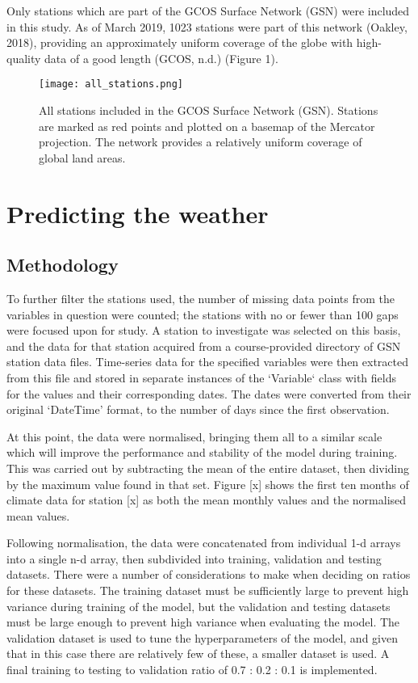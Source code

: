 \documentclass[12pt]{article}
\begin{document}
Only stations which are part of the GCOS Surface Network (GSN) were included in this study. As of March 2019, 1023 stations were part 
of this network (Oakley, 2018), providing an approximately uniform coverage of the globe with high-quality data of a good length 
(GCOS, n.d.) (Figure 1).

    \begin{figure}
        \centering
        \texttt{[image: all\_stations.png]}
        \caption{All stations included in the GCOS Surface Network (GSN). Stations are marked as red points and plotted on a basemap 
        of the Mercator projection. The network provides a relatively uniform coverage of global land areas.}
        \label{fig:my_label}
    \end{figure}

\section{Predicting the weather}
\subsection{Methodology}


To further filter the stations used, the number of missing data points from the variables in question were counted; the stations with 
no or fewer than 100 gaps were focused upon for study. A station to investigate was selected on this basis, and the data for that 
station acquired from a course-provided directory of GSN station data files. Time-series data for the specified variables were then 
extracted from this file and stored in separate instances of the `Variable` class with fields for the values and their corresponding 
dates. The dates were converted from their original ‘DateTime’ format, to the number of days since the first observation.

At this point, the data were normalised, bringing them all to a similar scale which will improve the performance and stability of the
 model during training. This was carried out by subtracting the mean of the entire dataset, then dividing by the maximum value found 
 in that set. Figure [x] shows the first ten months of climate data for station [x] as both the mean monthly values and the normalised
  mean values.

Following normalisation, the data were concatenated from individual 1-d arrays into a single n-d array, then subdivided into training, 
validation and testing datasets. There were a number of considerations to make when deciding on ratios for these datasets. The training
 dataset must be sufficiently large to prevent high variance during training of the model, but the validation and testing datasets must 
 be large enough to prevent high variance when evaluating the model. The validation dataset is used to tune the hyperparameters of the 
 model, and given that in this case there are relatively few of these, a smaller dataset is used. A final training to testing to validation 
 ratio of 0.7 : 0.2 : 0.1 is implemented.
\end{document}
